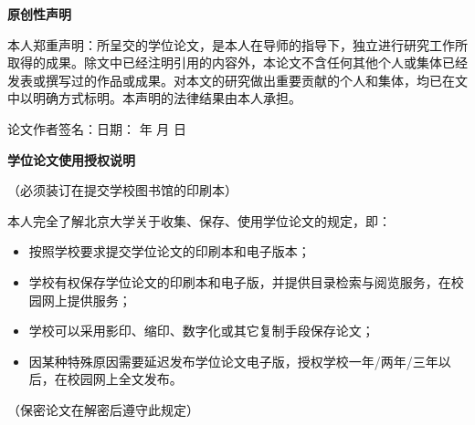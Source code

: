 \documentclass[UTF8,openany,AutoFakeBold,AutoFakeSlant,cs4size]{ctexbook}
\begin{document}
\begin{center}
\songti \bfseries {}
原创性声明
\end{center}

{
\songti 
本人郑重声明：所呈交的学位论文，是本人在导师的指导下，独立进行研究工作所取得的成果。除文中已经注明引用的内容外，本论文不含任何其他个人或集体已经发表或撰写过的作品或成果。对本文的研究做出重要贡献的个人和集体，均已在文中以明确方式标明。本声明的法律结果由本人承担。

\quad

\hspace*{0.22\linewidth} 论文作者签名：\quad\quad\quad\quad\quad 日期：\quad\quad\; 年\quad \; 月\quad \; 日
}

\quad

\begin{center}
\songti \bfseries {}
学位论文使用授权说明
\end{center}
\vspace*{-0.4in}
\begin{center}
\songti \fontsize{9}{9}
（必须装订在提交学校图书馆的印刷本）
\end{center}

{
\songti
{
本人完全了解北京大学关于收集、保存、使用学位论文的规定，即：
\renewcommand{\labelitemi}{●}
\begin{itemize}
    \setlength\itemsep{0.0in}
    \item \;\;按照学校要求提交学位论文的印刷本和电子版本；
    \item \;\;学校有权保存学位论文的印刷本和电子版，并提供目录检索与阅览服务，在校园网上提供服务；
    \item \;\;学校可以采用影印、缩印、数字化或其它复制手段保存论文；
    \item \;\;因某种特殊原因需要延迟发布学位论文电子版，授权学校{}一年/{}两年/{}三年以后，在校园网上全文发布。
\end{itemize}
}

}

\quad

{\songti
\hspace*{0.2\linewidth} （保密论文在解密后遵守此规定）
}
\end{document}
